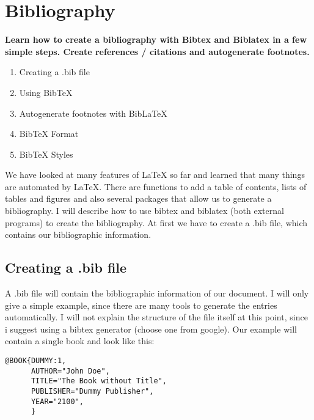 

\maketitle
\newpage
\section{Bibliography}
  \textbf{Learn how to create a bibliography with Bibtex and Biblatex in a few simple steps. Create references / citations and autogenerate footnotes.}
  \begin{enumerate} %
    \item Creating a .bib file
    \item Using BibTeX
    \item Autogenerate footnotes with BibLaTeX
    \item BibTeX Format
    \item BibTeX Styles
  \end{enumerate} 
    We have looked at many features of LaTeX so far and learned that many things are automated by LaTeX. There are functions to add a table of contents, lists of tables and figures and also several packages that allow us to generate a bibliography. I will describe how to use bibtex and biblatex (both external programs) to create the bibliography. At first we have to create a .bib file, which contains our bibliographic information.
  
  \subsection{Creating a .bib file}
    A .bib file will contain the bibliographic information of our document. I will only give a simple example, since there are many tools to generate the entries automatically. I will not explain the structure of the file itself at this point, since i suggest using a bibtex generator (choose one from google). Our example will contain a single book and look like this:
    
    
    \begin{lstlisting}[language={[LaTeX]TeX}, breaklines=true,frame=single]
      @BOOK{DUMMY:1,
      AUTHOR="John Doe",
      TITLE="The Book without Title",
      PUBLISHER="Dummy Publisher",
      YEAR="2100",
      }
    \end{lstlisting}

